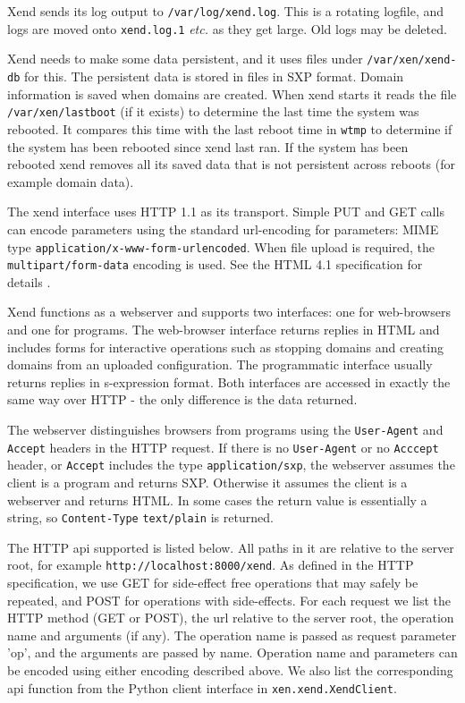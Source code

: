 \documentclass[11pt,twoside,final,openright]{report}
\begin{document}
Xend sends its log output to {\tt /var/log/xend.log}. This is a rotating logfile,
and logs are moved onto {\tt xend.log.1} {\it etc.} as they get large. Old logs may
be deleted.

Xend needs to make some data persistent, and it uses files under {\tt /var/xen/xend-db}
for this. The persistent data is stored in files in SXP format. Domain information
is saved when domains are created. When xend starts it reads the file {\tt /var/xen/lastboot}
(if it exists) to determine the last time the system was rebooted. It compares this time
with the last reboot time in {\tt wtmp} to determine if the system has been rebooted
since xend last ran. If the system has been rebooted xend removes all its saved data
that is not persistent across reboots (for example domain data).

 The xend interface uses HTTP 1.1 \cite{http} as its transport.
Simple PUT and GET calls can encode parameters using the standard url-encoding 
for parameters: MIME type {\tt application/x-www-form-urlencoded}.
When file upload is required, the {\tt multipart/form-data} encoding is used.
See the HTML 4.1 specification for details \cite{html}.

Xend functions as a webserver and supports two interfaces: one
for web-browsers and one for programs.
The web-browser interface returns replies in HTML and includes forms
for interactive operations such as stopping domains and creating domains
from an uploaded configuration. The programmatic interface usually returns replies
in s-expression format. Both interfaces are accessed
in exactly the same way over HTTP - the only difference is the data returned.

The webserver distinguishes browsers from programs using the {\tt User-Agent}
and {\tt Accept} headers in the HTTP request. If there is no {\tt User-Agent} or no
{\tt Acccept} header, or {\tt Accept} includes the type {\tt application/sxp}, the
webserver assumes the client is a program and returns SXP. Otherwise
it assumes the client is a webserver and returns HTML.
In some cases the return value is essentially a string, so {\tt Content-Type}
{\tt text/plain} is returned.

The HTTP api supported is listed below. All paths in it are relative to the
server root, for example {\tt http://localhost:8000/xend}.
As defined in the HTTP specification, we use GET for side-effect free
operations that may safely be repeated, and POST for operations with
side-effects. For each request we list the HTTP method (GET or POST),
the url relative to the server root, the operation name and arguments (if any).
The operation name is passed as request parameter 'op', and the arguments
are passed by name. Operation name and parameters can be encoded using either
encoding described above. We also list the corresponding api function from the
Python client interface in {\tt xen.xend.XendClient}.
\end{document}
